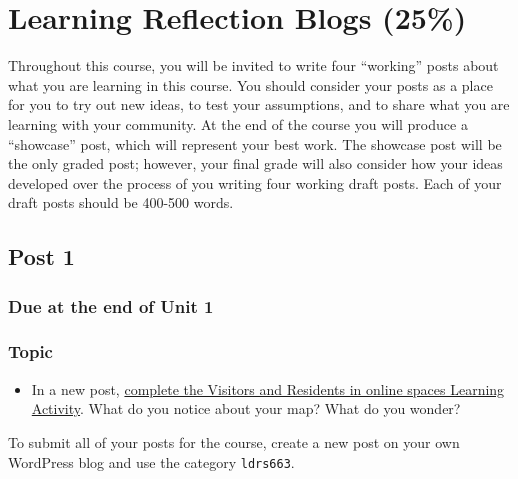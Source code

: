 \documentclass[
]{book}
\providecommand{\tightlist}{%
  \setlength{\itemsep}{0pt}\setlength{\parskip}{0pt}}
\begin{document}
\hypertarget{learning-reflection-blogs-25}{%
\section*{Learning Reflection Blogs (25\%)}\label{learning-reflection-blogs-25}}

Throughout this course, you will be invited to write four ``working'' posts about what you are learning in this course. You should consider your posts as a place for you to try out new ideas, to test your assumptions, and to share what you are learning with your community. At the end of the course you will produce a ``showcase'' post, which will represent your best work. The showcase post will be the only graded post; however, your final grade will also consider how your ideas developed over the process of you writing four working draft posts.
Each of your draft posts should be 400-500 words.

\hypertarget{post-1}{%
\subsection*{Post 1}\label{post-1}}

\hypertarget{due-at-the-end-of-unit-1}{%
\subsubsection*{Due at the end of Unit 1}\label{due-at-the-end-of-unit-1}}

\hypertarget{topic}{%
\subsubsection*{Topic}\label{topic}}

\begin{itemize}
\tightlist
\item
  In a new post, \href{https://ma-lead.github.io/ldrs663/building-the-web.html\#learning-activity}{complete the Visitors and Residents in online spaces Learning Activity}. What do you notice about your map? What do you wonder?
\end{itemize}

To submit all of your posts for the course, create a new post on your own WordPress blog and use the category \texttt{ldrs663}.
\end{document}

